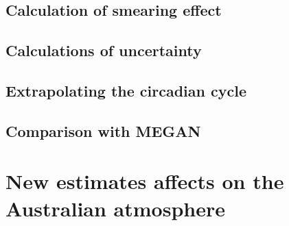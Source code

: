   \subsection{Calculation of smearing effect}
  \subsection{Calculations of uncertainty}
    
  \subsection{Extrapolating the circadian cycle}
    
  \subsection{Comparison with MEGAN}

\section{New estimates affects on the Australian atmosphere}

